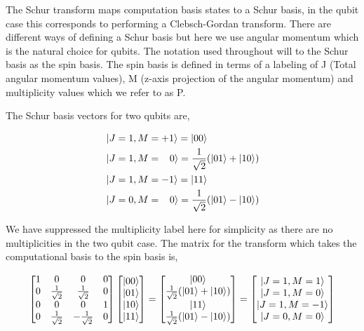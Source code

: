 \documentclass[12pt]{article}
\begin{document}
The Schur transform maps computation basis states to a Schur basis, in the qubit case this corresponds to performing a Clebsch-Gordan transform. There are different ways of defining a Schur basis but here we use angular momentum which is the natural choice for qubits. The notation used throughout will to the Schur basis as the spin basis. The spin basis is defined in terms of a labeling of J (Total angular momentum values), M (z-axis projection of the angular momentum) and multiplicity values which we refer to as P.

The Schur basis vectors for two qubits are,

\begin{subequations}
\begin{align}
\begin{split}
&\left\vert{J=1, M=+1}\right\rangle = \left\vert{00}\right\rangle \\
&\left\vert{J=1, M=\;\;\;0}\right\rangle = \frac{1}{\sqrt{2}}(\left\vert{01}\right\rangle + \left\vert{10}\right\rangle) \\
&\left\vert{J=1, M=-1}\right\rangle = \left\vert{11}\right\rangle \\
\end{split}\\
\begin{split}
&\left\vert{J=0, M=\;\;\;0}\right\rangle = \frac{1}{\sqrt{2}}(\left\vert{01}\right\rangle - \left\vert{10}\right\rangle)\\
\end{split}
\end{align}
\end{subequations}

We have suppressed the multiplicity label here for simplicity as there are no multiplicities in the two qubit case. The matrix for the transform which takes the computational basis to the spin basis is,

\begin{align}
\begin{bmatrix}
1 & 0 & 0 & 0 \\
0 & \frac{1}{\sqrt{2}} & \frac{1}{\sqrt{2}} & 0 \\
0 & 0 & 0 & 1 \\
0 & \frac{1}{\sqrt{2}} & -\frac{1}{\sqrt{2}} & 0 \\
\end{bmatrix}
\begin{bmatrix}
\left\vert{00}\right\rangle \\
\left\vert{01}\right\rangle \\
\left\vert{10}\right\rangle \\
\left\vert{11}\right\rangle \\ 
\end{bmatrix}
=
\begin{bmatrix}
\left\vert{00}\right\rangle \\
\frac{1}{\sqrt{2}}(\left\vert{01}\right\rangle + \left\vert{10}\right\rangle) \\
\left\vert{11}\right\rangle \\
\frac{1}{\sqrt{2}}(\left\vert{01}\right\rangle - \left\vert{10}\right\rangle) \\ 
\end{bmatrix}
=
\begin{bmatrix}
\left\vert{J=1, M=1}\right\rangle \\
\left\vert{J=1, M=0}\right\rangle \\
\left\vert{J=1, M=-1}\right\rangle \\
\left\vert{J=0, M=0}\right\rangle \\ 
\end{bmatrix}
\end{align}
\end{document}

